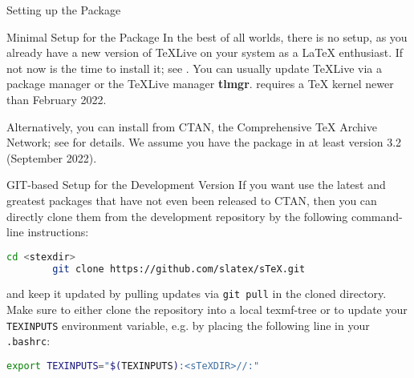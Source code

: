 \begin{sfragment}{Setting up the \sTeX Package}

    \begin{sfragment}[id=sec.minimal-setup]{Minimal Setup for the \sTeX Package}
        In the best of all worlds, there is no setup, as you already have a new version of
        {\TeX}Live on your system as a {\LaTeX} enthusiast. If not now is the time to
        install it; see \cite{TeXLive:on}. You can usually update {\TeX}Live via a package
        manager or the {\TeX}Live manager \textbf{tlmgr}.
        \sTeX requires a \TeX{} kernel newer than February 2022. 

        Alternatively, you can install \sTeX from CTAN, the Comprehensive {\TeX} Archive
        Network; see \cite{stexCTAN:on} for details. We
        assume you have the \sTeX package in at least version 3.2 (September 2022).
    \end{sfragment}

    \begin{sfragment}[id=sec.git-setup]{GIT-based Setup for the \sTeX Development Version}
        If you want use the latest and greatest \sTeX packages
        that have not even been released to CTAN, 
        then you can directly clone them from the \sTeX development
        repository \cite{sTeX:github:on} by the following command-line instructions: 
        \begin{lstlisting}[language=bash]
        cd <stexdir>
        git clone https://github.com/slatex/sTeX.git
        \end{lstlisting}
        and keep it updated by pulling updates via \lstinline|git pull| in the cloned \sTeX
        directory.
        Make sure to either clone the \sTeX repository into a local texmf-tree or to update your \lstinline|TEXINPUTS| environment variable, e.g. by placing the following line in your \lstinline|.bashrc|:
        \begin{lstlisting}[language=bash]
        export TEXINPUTS="$(TEXINPUTS):<sTeXDIR>//:"
        \end{lstlisting}       
    \end{sfragment}

    
    
\end{sfragment}